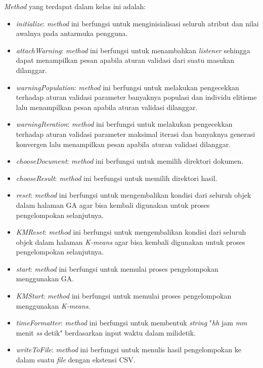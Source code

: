 \textit{Method} yang terdapat dalam kelas ini adalah:

\begin{itemize}
	\item \textit{initialize}: \textit{method} ini berfungsi untuk menginisialisasi seluruh atribut dan nilai awalnya pada antarmuka pengguna.
	\item \textit{attachWarning}: \textit{method} ini berfungsi untuk menambahkan \textit{listener} sehingga dapat menampilkan pesan apabila aturan validasi dari suatu masukan dilanggar.
	\item \textit{warningPopulation}: \textit{method} ini berfungsi untuk melakukan pengecekkan terhadap aturan validasi parameter banyaknya populasi dan individu elitisme lalu menampilkan pesan apabila aturan validasi dilanggar.
	\item \textit{warningIteration}: \textit{method} ini berfungsi untuk melakukan pengecekkan terhadap aturan validasi parameter maksimal iterasi dan banyaknya generasi konvergen lalu menampilkan pesan apabila aturan validasi dilanggar.
	\item \textit{chooseDocument}: \textit{method} ini berfungsi untuk memilih direktori dokumen.
	\item \textit{chooseResult}: \textit{method} ini berfungsi untuk memilih direktori hasil.
	\item \textit{reset}: \textit{method} ini berfungsi untuk mengembalikan kondisi dari seluruh objek dalam halaman GA agar bisa kembali digunakan untuk proses pengelompokan selanjutnya.
	\item \textit{KMReset}: \textit{method} ini berfungsi untuk mengembalikan kondisi dari seluruh objek dalam halaman \textit{K-means} agar bisa kembali digunakan untuk proses pengelompokan selanjutnya.
	\item \textit{start}: \textit{method} ini berfungsi untuk memulai proses pengelompokan menggunakan GA.
	\item \textit{KMStart}: \textit{method} ini berfungsi untuk memulai proses pengelompokan menggunakan \textit{K-means}.
	\item \textit{timeFormatter}: \textit{method} ini berfungsi untuk membentuk \textit{string} "\textit{hh} jam \textit{mm} menit \textit{ss} detik" berdasarkan input waktu dalam milidetik.
	\item \textit{writeToFile}: \textit{method} ini berfungsi untuk menulis hasil pengelompokan ke dalam suatu \textit{file} dengan ekstensi CSV.
\end{itemize}

